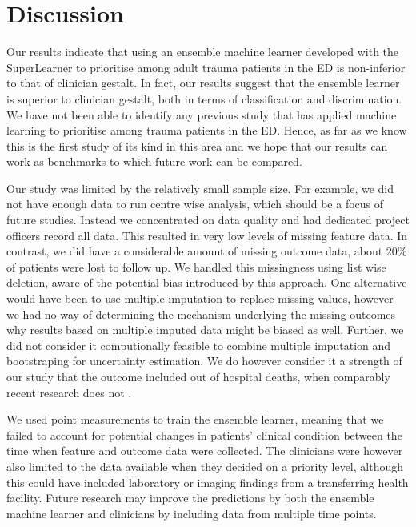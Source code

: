 \documentclass[10pt,letterpaper]{article}\usepackage[]{graphicx}\usepackage[]{color}
\begin{document}
\section*{Discussion}
Our results indicate that using an ensemble machine learner developed with the
SuperLearner to prioritise among adult trauma patients in the ED is non-inferior
to that of clinician gestalt. In fact, our results suggest that the ensemble
learner is superior to clinician gestalt, both in terms of classification and
discrimination. We have not been able to identify any previous study that has
applied machine learning to prioritise among trauma patients in the ED. Hence,
as far as we know this is the first study of its kind in this area and we hope
that our results can work as benchmarks to which future work can be compared.

Our study was limited by the relatively small sample size. For example, we did
not have enough data to run centre wise analysis, which should be a focus of
future studies. Instead we concentrated on data quality and had dedicated
project officers record all data. This resulted in very low levels of missing
feature data. In contrast, we did have a considerable amount of missing outcome
data, about 20\% of patients were lost to follow up. We handled this missingness
using list wise deletion, aware of the potential bias introduced by this
approach. One alternative would have been to use multiple imputation to replace
missing values, however we had no way of determining the mechanism underlying
the missing outcomes why results based on multiple imputed data might be biased
as well. Further, we did not consider it computionally feasible to combine
multiple imputation and bootstraping for uncertainty estimation. We do however
consider it a strength of our study that the outcome included out of hospital
deaths, when comparably recent research does not \cite{Levin2018, Kunitake2018}.

We used point measurements to train the ensemble learner, meaning that we failed
to account for potential changes in patients' clinical condition between the
time when feature and outcome data were collected. The clinicians were however
also limited to the data available when they decided on a priority level,
although this could have included laboratory or imaging findings from a
transferring health facility. Future research may improve the predictions by
both the ensemble machine learner and clinicians by including data from multiple
time points.
\end{document}
